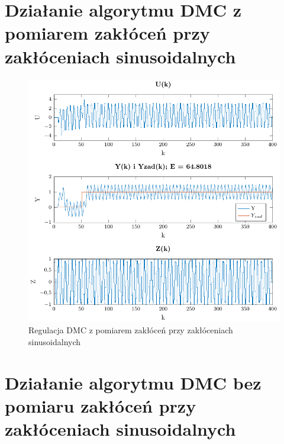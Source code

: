 \documentclass[a4paper,titlepage,11pt,twosides,floatssmall]{mwrep}
\begin{document}
\section{Działanie algorytmu DMC z pomiarem zakłóceń przy zakłóceniach sinusoidalnych}


\begin{figure}[H]
	\centering
	\includegraphics{../../Lab2/PDF_rysunki/Z6_DMCSinZOdsprz.pdf}
	\caption{Regulacja DMC z pomiarem zakłóceń przy zakłóceniach sinusoidalnych}
	\label{sin_z_pom}
\end{figure}

\section{Działanie algorytmu DMC bez pomiaru zakłóceń przy zakłóceniach sinusoidalnych}
\end{document}
